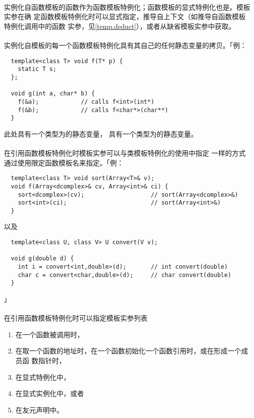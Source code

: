 \paragraph{}
实例化自函数模板的函数作为函数模板特例化；函数模板的显式特例化也是。模板实参在确
定函数模板特例化时可以显式指定，推导自上下文（如推导自函数模板特例化调用中的函数
实参，见\ref{temp.deduct}），或者从缺省模板实参中获取。

\paragraph{}
实例化自模板的每一个函数模板特例化具有其自己的任何静态变量的拷贝。「例：
\begin{lstlisting}
  template<class T> void f(T* p) {
    static T s;
  };

  void g(int a, char* b) {
    f(&a);            // calls f<int>(int*)
    f(&b);            // calls f<char*>(char**)
  }
\end{lstlisting}
此处具有一个类型为的静态变量，
具有一个类型为的静态变量。

\paragraph{}
在引用函数模板特例化时模板实参可以与类模板特例化的使用中指定
一样的方式通过使用限定函数模板名来指定。「例：
\begin{lstlisting}
  template<class T> void sort(Array<T>& v);
  void f(Array<dcomplex>& cv, Array<int>& ci) {
    sort<dcomplex>(cv);                   // sort(Array<dcomplex>&)
    sort<int>(ci);                        // sort(Array<int>&)
  }
\end{lstlisting}
以及
\begin{lstlisting}
  template<class U, class V> U convert(V v);

  void g(double d) {
    int i = convert<int,double>(d);       // int convert(double)
    char c = convert<char,double>(d);     // char convert(double)
  }
\end{lstlisting}」

\paragraph{}
在引用函数模板特例化时可以指定模板实参列表
\begin{enumerate}
  \item{在一个函数被调用时，}
  \item{在取一个函数的地址时，在一个函数初始化一个函数引用时，或在形成一个成员函
    数指针时，}
  \item{在显式特例化中，}
  \item{在显式实例化中，或者}
  \item{在友元声明中。}
\end{enumerate}

